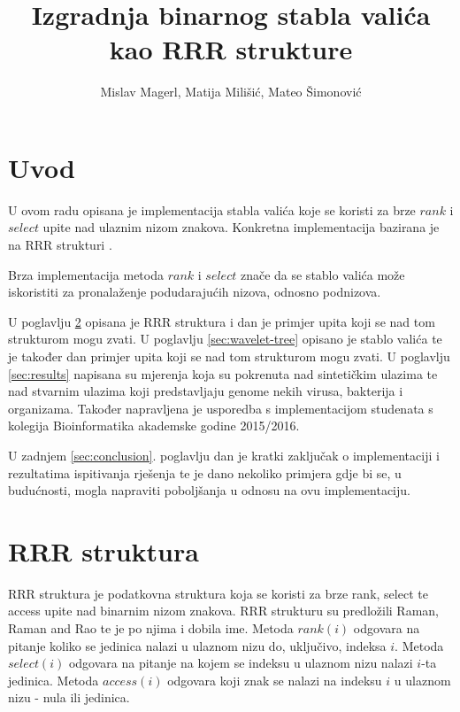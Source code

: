 \documentclass[times, utf8, seminar, numeric]{fer}
\begin{document}
\title{Izgradnja binarnog stabla valića kao RRR strukture}
\author{Mislav Magerl, Matija Milišić, Mateo Šimonović}

\maketitle

\tableofcontents

\chapter{Uvod}
U ovom radu opisana je implementacija stabla valića\citep{alexbowe}  koje se koristi za brze $rank$ i $select$ upite nad ulaznim nizom znakova. Konkretna implementacija bazirana je na RRR strukturi \citep{DBLP:journals/corr/abs-0705-0552}.



Brza implementacija metoda $rank$ i $select$ znače da se stablo valića može iskoristiti za pronalaženje podudarajućih nizova, odnosno podnizova. 

U poglavlju \ref{sec:rrr} opisana je RRR struktura i dan je primjer upita koji se nad tom strukturom mogu zvati. U poglavlju \ref{sec:wavelet-tree} opisano je stablo valića te je također dan primjer upita koji se nad tom strukturom mogu zvati. U poglavlju \ref{sec:results} napisana su mjerenja koja su pokrenuta nad sintetičkim ulazima te nad stvarnim ulazima koji predstavljaju genome nekih virusa, bakterija i organizama. Također napravljena je usporedba s implementacijom studenata s kolegija Bioinformatika akademske godine 2015/2016. 

U zadnjem \ref{sec:conclusion}. poglavlju dan je kratki zaključak o implementaciji i rezultatima ispitivanja rješenja te je dano nekoliko primjera gdje bi se, u budućnosti, mogla napraviti poboljšanja u odnosu na ovu implementaciju. 

\chapter{RRR struktura}
\label{sec:rrr}
RRR struktura je podatkovna struktura koja se koristi za brze rank, select te access upite nad binarnim nizom znakova. RRR strukturu su predložili Raman, Raman and Rao \citep{DBLP:journals/corr/abs-0705-0552} te je po njima i dobila ime. Metoda $rank(i)$ odgovara na pitanje koliko se jedinica nalazi u ulaznom nizu do, uključivo, indeksa $i$. Metoda $select(i)$ odgovara na pitanje na kojem se indeksu u ulaznom nizu nalazi $i$-ta jedinica. Metoda $access(i)$ odgovara koji znak se nalazi na indeksu $i$ u ulaznom nizu - nula ili jedinica.
\end{document}
